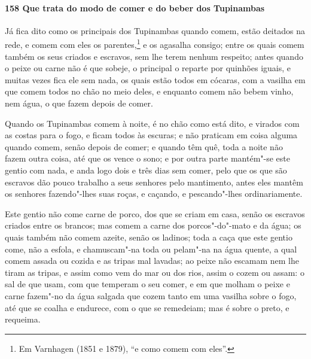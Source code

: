 \paragraph{158 Que trata do modo de comer e do beber dos Tupinambas}

Já fica dito como os principais dos Tupinambas quando comem, estão deitados na rede, e
comem com eles os parentes,\footnote{ Em Varnhagen (1851 e 1879), ``e como comem com
eles''.} e os agasalha consigo; entre os quais comem também os seus criados e escravos,
sem lhe terem nenhum respeito; antes quando o peixe ou carne não é que sobeje, o principal
o reparte por quinhões iguais, e muitas vezes fica ele sem nada, os quais estão todos em
cócaras, com a vasilha em que comem todos no chão no meio deles, e enquanto comem não
bebem vinho, nem água, o que fazem depois de comer.

Quando os Tupinambas comem à noite, é no chão como está dito, e virados com as costas para
o fogo, e ficam todos às escuras; e não praticam em coisa alguma quando comem, senão
depois de comer; e quando têm quê, toda a noite não fazem outra coisa, até que os vence o
sono; e por outra parte mantém"-se este gentio com nada, e anda logo dois e três dias sem
comer, pelo que os que são escravos dão pouco trabalho a seus senhores pelo mantimento,
antes eles mantêm os senhores fazendo"-lhes suas roças, e caçando, e pescando"-lhes
ordinariamente.

Este gentio não come carne de porco, dos que se criam em casa, senão os escravos criados
entre os brancos; mas comem a carne dos porcos"-do"-mato e da água; os quais também não
comem azeite, senão os ladinos; toda a caça que este gentio come, não a esfola, e
chamuscam"-na toda ou pelam"-na na água quente, a qual comem assada ou cozida e as tripas
mal lavadas; ao peixe não escamam nem lhe tiram as tripas, e assim como vem do mar ou dos
rios, assim o cozem ou assam: o sal de que usam, com que temperam o seu comer, e em que
molham o peixe e carne fazem"-no da água salgada que cozem tanto em uma vasilha sobre o
fogo, até que se coalha e endurece, com o que se remedeiam; mas é sobre o preto, e
requeima.

